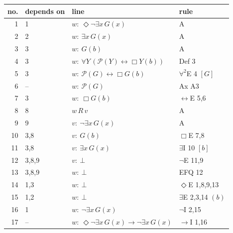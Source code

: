 {\footnotesize\setlength{\tabcolsep}{4pt}
\begin{longtable}{@{}r>{\raggedright}p{}p{}>{\raggedright\arraybackslash}p{}@{}}\toprule
no. & depends on & line & rule\\\midrule\endhead
1 & 1 & $w:\ \Diamond \neg \exists x\, G(x)$ & A\\
2 & 2 & $w:\ \exists x\, G(x)$ & A\\
3 & 3 & $w:\ G(b)$ & A\\
4 & 3 & $w:\ \forall Y\, (\mathcal{P}(Y) \leftrightarrow \Box Y(b))$ & Def 3\\
5 & 3 & $w:\ \mathcal{P}(G) \leftrightarrow \Box G(b)$ & $\forall^2$E 4 $[G]$\\
6 & -- & $w:\ \mathcal{P}(G)$ & Ax A3\\
7 & 3 & $w:\ \Box G(b)$ & $\leftrightarrow$E 5,6\\
8 & 8 & $w\,R\,v$ & A\\
9 & 9 & $v:\ \neg \exists x\, G(x)$ & A\\
10 & 3,8 & $v:\ G(b)$ & $\Box$E 7,8\\
11 & 3,8 & $v:\ \exists x\, G(x)$ & $\exists$I 10 $[b]$\\
12 & 3,8,9 & $v:\ \bot$ & $\neg$E 11,9\\
13 & 3,8,9 & $w:\ \bot$ & EFQ 12\\
14 & 1,3 & $w:\ \bot$ & $\Diamond$E 1,8,9,13\\
15 & 1,2 & $w:\ \bot$ & $\exists$E 2,3,14 $(b)$\\
16 & 1 & $w:\ \neg \exists x\, G(x)$ & $\neg$I 2,15\\
17 & -- & $w:\ \Diamond \neg \exists x\, G(x) \to \neg \exists x\, G(x)$ & $\to$I 1,16\\
\bottomrule\end{longtable}}
